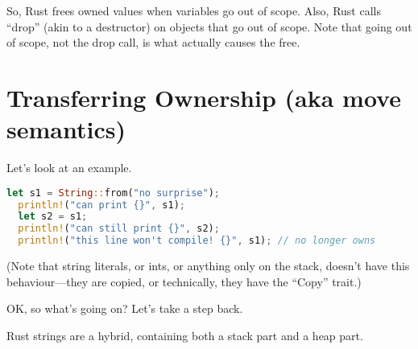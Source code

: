 So, Rust frees owned values when variables go out of scope. Also, Rust calls
``drop'' (akin to a destructor) on objects that go out of scope. Note that
going out of scope, not the drop call, is what actually causes the free.

\section*{Transferring Ownership (aka move semantics)}

Let's look at an example.
\begin{lstlisting}[language=Rust]
  let s1 = String::from("no surprise");
  println!("can print {}", s1);
  let s2 = s1;
  println!("can still print {}", s2);
  println!("this line won't compile! {}", s1); // no longer owns
\end{lstlisting}

(Note that string literals, or ints, or anything only on the stack,
doesn't have this behaviour---they are copied, or technically, they
have the ``Copy'' trait.)

OK, so what's going on? Let's take a step back.

Rust strings are a hybrid, containing both a stack part and a heap part.

\begin{center}
\end{center}

